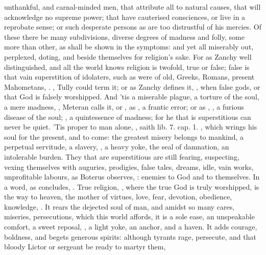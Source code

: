 {unthankful, and carnal-minded men, that attribute all to natural
causes, that will acknowledge no supreme power; that have cauterised
consciences, or live in a reprobate sense; or such desperate persons as
are too distrustful of his mercies. Of these there be many
subdivisions, diverse degrees of madness and folly, some more than
other, as shall be shown in the symptoms: and yet all miserably out,
perplexed, doting, and beside themselves for religion's sake. For as
Zanchy well distinguished, and all the world knows religion is
twofold, true or false; false is that vain superstition of idolaters,
such as were of old, Greeks, Romans, present Mahometans, \etc{}. , Tully could term it; or as Zanchy defines it, , when false gods, or that God
is falsely worshipped. And 'tis a miserable plague, a torture of the
soul, a mere madness, , Meteran calls it, or
, as \Seneca, a frantic error; or as \Austin{}, , a furious disease of the soul; , a quintessence of madness; for he that is
superstitious can never be quiet. 'Tis proper to man alone, , saith \Pliny{} \textlatin{lib. 7. cap. 1.} , which wrings his soul for the present, and
to come: the greatest misery belongs to mankind, a perpetual servitude,
a slavery, , a heavy yoke, the seal of damnation,
an intolerable burden. They that are superstitious are still fearing,
suspecting, vexing themselves with auguries, prodigies, false tales,
dreams, idle, vain works, unprofitable labours, as Boterus
observes, : enemies to God and to
themselves. In a word, as \Seneca concludes, . True religion, , where the true God is
truly worshipped, is the way to heaven, the mother of virtues, love,
fear, devotion, obedience, knowledge, \etc{}. It rears the dejected soul of
man, and amidst so many cares, miseries, persecutions, which this world
affords, it is a sole ease, an unspeakable comfort, a sweet reposal,
, a light yoke, an anchor, and a haven. It adds
courage, boldness, and begets generous spirits: although tyrants rage,
persecute, and that bloody Lictor or sergeant be ready to martyr them,
}

